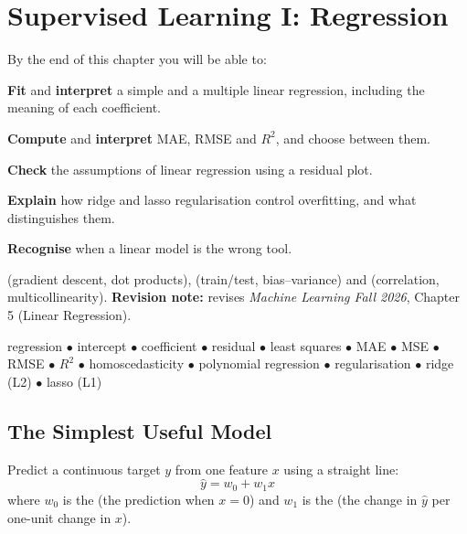 \chapter{Supervised Learning I: Regression}\label{ch:regression}

\begin{outcomes}
By the end of this chapter you will be able to:
\begin{tight}
  \item \textbf{Fit} and \textbf{interpret} a simple and a multiple linear regression, including the meaning of each coefficient.
  \item \textbf{Compute} and \textbf{interpret} MAE, RMSE and $R^2$, and choose between them.
  \item \textbf{Check} the assumptions of linear regression using a residual plot.
  \item \textbf{Explain} how ridge and lasso regularisation control overfitting, and what distinguishes them.
  \item \textbf{Recognise} when a linear model is the wrong tool.
\end{tight}
\end{outcomes}

\begin{prereq}
 (gradient descent, dot products), 
(train/test, bias--variance) and  (correlation, multicollinearity).
\textbf{Revision note:} revises \emph{Machine Learning Fall 2026}, Chapter 5
(Linear Regression).
\end{prereq}

\begin{keyterms}
regression $\bullet$ intercept $\bullet$ coefficient $\bullet$ residual $\bullet$
least squares $\bullet$ MAE $\bullet$ MSE $\bullet$ RMSE $\bullet$ $R^2$ $\bullet$
homoscedasticity $\bullet$ polynomial regression $\bullet$ regularisation
$\bullet$ ridge (L2) $\bullet$ lasso (L1)
\end{keyterms}

\section{The Simplest Useful Model}

\begin{definitionbox}
Predict a continuous target $y$ from one feature $x$ using a straight line:
\[
\hat{y} = w_0 + w_1 x
\]
where $w_0$ is the  (the prediction when $x=0$) and $w_1$ is the
 (the change in $\hat{y}$ per one-unit change in $x$).
\end{definitionbox}

